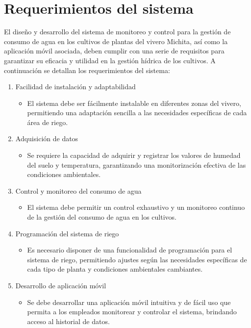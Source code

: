 \section{Requerimientos del sistema}
El diseño y desarrollo del sistema de monitoreo y control para la gestión de consumo de agua en los cultivos de plantas del vivero Michita, así como la aplicación móvil asociada, deben cumplir con una serie de requisitos para garantizar su eficacia y utilidad en la gestión hídrica de los cultivos. A continuación se detallan los requerimientos del sistema:

\begin{enumerate}
	\item Facilidad de instalación y adaptabilidad
	    \begin{itemize}
		    \item El sistema debe ser fácilmente instalable en diferentes zonas del vivero, permitiendo una adaptación sencilla a las necesidades específicas de cada área de riego.
	    \end{itemize}
	\item Adquisición de datos
	    \begin{itemize}
		    \item Se requiere la capacidad de adquirir y registrar los valores de humedad del suelo y temperatura, garantizando una monitorización efectiva de las condiciones ambientales.
	    \end{itemize}
	\item Control y monitoreo del consumo de agua
	    \begin{itemize}
		    \item El sistema debe permitir un control exhaustivo y un monitoreo continuo de la gestión del consumo de agua en los cultivos.
	    \end{itemize}
	\item Programación del sistema de riego
	    \begin{itemize}
		    \item Es necesario disponer de una funcionalidad de programación para el sistema de riego, permitiendo ajustes según las necesidades específicas de cada tipo de planta y condiciones ambientales cambiantes.
	    \end{itemize}
	\item Desarrollo de aplicación móvil
	    \begin{itemize}
		    \item Se debe desarrollar una aplicación móvil intuitiva y de fácil uso que permita a los empleados monitorear y controlar el sistema, brindando acceso al historial de datos. 
	    \end{itemize}
\end{enumerate}